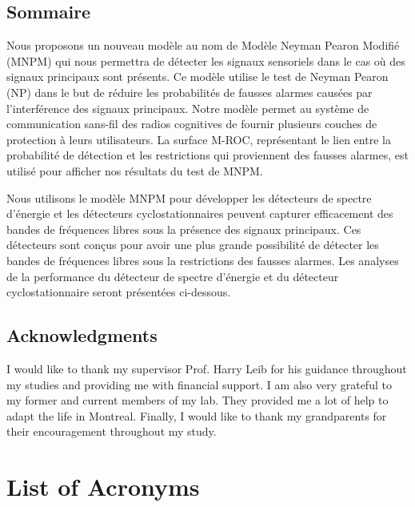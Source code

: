 \documentclass [12pt,letterpaper]{report}
\begin{document}
\section*{\centering Sommaire}
Nous proposons un nouveau modèle au nom de Modèle Neyman Pearon Modifié (MNPM) qui nous permettra de détecter les signaux sensoriels dans le cas où des signaux principaux sont présents. Ce modèle utilise le test de Neyman Pearon (NP) dans le but de réduire les probabilités de fausses alarmes causées par l'interférence des signaux principaux. Notre modèle permet au système de communication sans-fil des radios cognitives de fournir plusieurs couches de protection à leurs utilisateurs. La surface M-ROC, représentant le lien entre la probabilité de détection et les restrictions qui proviennent des fausses alarmes, est utilisé pour afficher nos résultats du test de MNPM.

Nous utilisons le modèle MNPM pour développer les détecteurs de spectre d'énergie et les détecteurs cyclostationnaires peuvent capturer efficacement des bandes de fréquences libres sous la présence des signaux principaux. Ces détecteurs sont conçus pour avoir une plus grande possibilité de détecter les bandes de fréquences libres sous la restrictions des fausses alarmes.
Les analyses de la performance du détecteur de spectre d'énergie et du détecteur cyclostationnaire seront présentées ci-dessous.

\newpage
{}
\section*{\centering Acknowledgments}

I would like to thank my supervisor Prof. Harry Leib for his guidance throughout my studies and providing me with financial support. I am also very grateful to my former and current members of my lab. They provided me a lot of help to adapt the life in Montreal. Finally,  I would like to thank my grandparents for their encouragement throughout my study. 
\tableofcontents
\listoffigures
\listoftables

\newpage
\chapter*{List of Acronyms}
\end{document}

